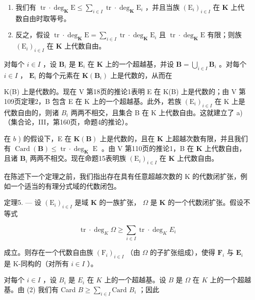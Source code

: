 \begin{enumerate}
\def\labelenumi{\alph{enumi})}
\item
  我们有 \(\operatorname{tr} \cdot \deg_{\mathbf{K}} \mathrm{E} \leqslant \sum_{i \in I} \operatorname{tr} \cdot \deg_{\mathbf{K}} \mathrm{E}_i\) ，并且当族 \((\mathrm{E}_i)_{i \in I}\) 在 \(\mathbf{K}\) 上代数自由时取等号。
\item
  反之，假设 \(\operatorname{tr} \cdot \deg_{\mathbf{K}} \mathrm{E} = \sum_{i \in I} \operatorname{tr} \cdot \deg_{\mathbf{K}} \mathrm{E}_i\) 且 \(\operatorname{tr} \cdot \deg_{\mathbf{K}} \mathrm{E}\) 有限；则族 \((\mathrm{E}_i)_{i \in I}\) 在 \(\mathbf{K}\) 上代数自由。
\end{enumerate}

对每个 \(i \in I\) ，设 \(\mathbf{B}_i\) 是 \(\mathbf{E}_i\) 在 \(\mathbf{K}\) 上的一个超越基，并设 \(\mathbf{B} = \bigcup_{i \in I} \mathbf{B}_i\) 。对每个 \(i \in I\) ， \(\mathbf{E}_i\) 的每个元素在 \(\mathbf{K}(\mathbf{B}_i)\) 上是代数的，从而在

K(B) 上是代数的。现在 V 第18页的推论1表明 E 在 K(B) 上是代数的；由 V 第109页定理2，B 包含 E 在 K 上的一个超越基。此外，若族 \((\mathrm{E}_{i})_{i\in I}\) 在 K 上是代数自由的，则诸 \(B_{i}\) 两两不相交，且集合 B 在 K 上代数自由。这就建立了 a)（集合论，III，第160页，命题4的推论）。

在 \(b\) ) 的假设下，E 在 \(\mathbf{K}(\mathbf{B})\) 上是代数的，且在 \(\mathbf{K}\) 上超越次数有限，并且我们有 \(\operatorname{Card}(\mathbf{B}) \leqslant \operatorname{tr} \cdot \deg_{\mathbf{K}} \operatorname{E}\) 。由 V 第110页的推论1，B 在 \(\mathbf{K}\) 上代数自由，且诸 \(\mathbf{B}_i\) 两两不相交。现在命题15表明族 \((\mathrm{E}_i)_{i \in I}\) 在 \(\mathbf{K}\) 上代数自由。

在陈述下一个定理之前，我们指出存在具有任意超越次数的 K 的代数闭扩张，例如一个适当的有理分式域的代数闭包。

定理5. --- 设 \((\mathrm{E}_i)_{i\in I}\) 是域 \(\mathbf{K}\) 的一族扩张， \(\Omega\) 是 \(\mathbf{K}\) 的一个代数闭扩张。假设不等式

\[
\operatorname{tr} \cdot \deg_ {K} \Omega \geqslant \sum_ {i \in I} \operatorname{tr} \cdot \deg_ {K} E _ {i}\tag{2}
\]

成立。则存在一个代数自由族 \((\mathrm{F}_i)_{i\in I}\) （由 \(\Omega\) 的子扩张组成），使得 \(\mathbf{F}_i\) 与 \(\mathbf{E}_i\) 是 K-同构的（对所有 \(i\in I\) ）。

对每个 \(i \in I\) ，设 \(B_i\) 是 \(E_i\) 在 \(K\) 上的一个超越基。设 \(B\) 是 \(\Omega\) 在 \(K\) 上的一个超越基。由 (2) 我们有 Card \(B \geqslant \sum_{i \in I} \text{Card } B_i\) ；因此

